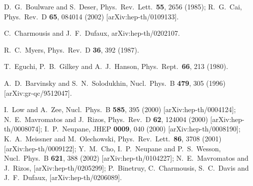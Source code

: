 \documentclass[a4paper,a4paper]{article}
\begin{document}
\begin{thebibliography}{99}
D.~G.~Boulware and S.~Deser,
Phys.\ Rev.\ Lett.\  {\bf 55}, 2656 (1985);
R.~G.~Cai,
Phys.\ Rev.\ D {\bf 65}, 084014 (2002)
[arXiv:hep-th/0109133].


C.~Charmousis and J.~F.~Dufaux,
arXiv:hep-th/0202107.

R.~C.~Myers,
Phys.\ Rev.\ D {\bf 36}, 392 (1987).

T.~Eguchi, P.~B.~Gilkey and A.~J.~Hanson,
Phys.\ Rept.\  {\bf 66}, 213 (1980).

A.~D.~Barvinsky and S.~N.~Solodukhin,
Nucl.\ Phys.\ B {\bf 479}, 305 (1996)
[arXiv:gr-qc/9512047].


I.~Low and A.~Zee,
Nucl.\ Phys.\ B {\bf 585}, 395 (2000)
[arXiv:hep-th/0004124];
N.~E.~Mavromatos and J.~Rizos,
Phys.\ Rev.\ D {\bf 62}, 124004 (2000)
[arXiv:hep-th/0008074];
I.~P.~Neupane,
JHEP {\bf 0009}, 040 (2000)
[arXiv:hep-th/0008190];
K.~A.~Meissner and M.~Olechowski,
Phys.\ Rev.\ Lett.\  {\bf 86}, 3708 (2001)
[arXiv:hep-th/0009122];
Y.~M.~Cho, I.~P.~Neupane and P.~S.~Wesson,
Nucl.\ Phys.\ B {\bf 621}, 388 (2002)
[arXiv:hep-th/0104227];
N.~E.~Mavromatos and J.~Rizos,
[arXiv:hep-th/0205299];
P.~Binetruy, C.~Charmousis, S.~C.~Davis and J.~F.~Dufaux,
[arXiv:hep-th/0206089].



\end{thebibliography}
\end{document}
